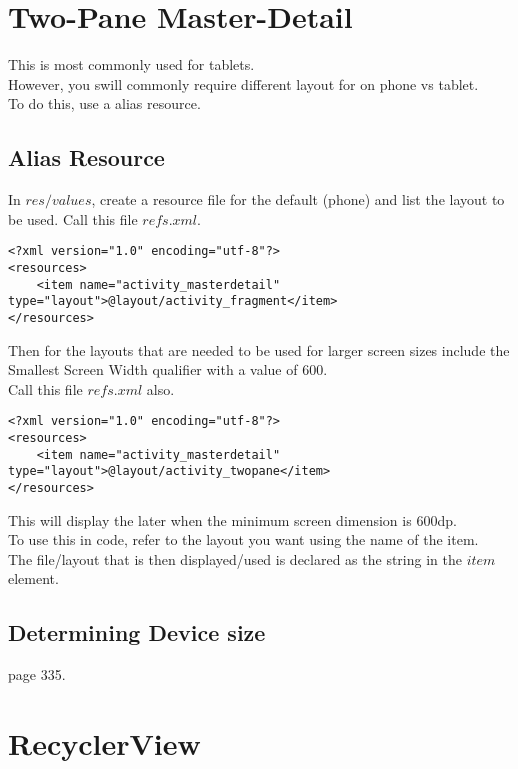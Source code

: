\documentclass[]{article}
\begin{document}
\section{Two-Pane Master-Detail}
This is most commonly used for tablets.  
\\
However, you swill commonly require different layout for on phone vs tablet.
\\
To do this, use a alias resource.
\subsection{Alias Resource}
In $res/values$, create a resource file for the default (phone) and list the layout to be used.  Call this file $refs.xml$.
\begin{lstlisting}
<?xml version="1.0" encoding="utf-8"?>
<resources>
	<item name="activity_masterdetail" type="layout">@layout/activity_fragment</item>
</resources>
\end{lstlisting}
Then for the layouts that are needed to be used for larger screen sizes include the Smallest Screen Width qualifier with a value of 600.
\\
Call this file $refs.xml$ also.
\begin{lstlisting}
<?xml version="1.0" encoding="utf-8"?>
<resources>
	<item name="activity_masterdetail" type="layout">@layout/activity_twopane</item>
</resources>
\end{lstlisting}
This will display the later when the minimum screen dimension is 600dp.
\\
To use this in code, refer to the layout you want using the name of the item.
\\
The file/layout that is then displayed/used is declared as the string in the $item$ element.

\subsection{Determining Device size}
page 335.


\section{RecyclerView}
\end{document}

